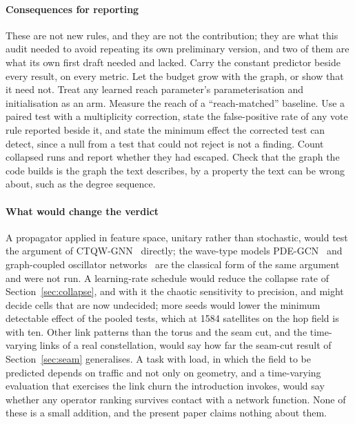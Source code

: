 \documentclass[preprint,11pt,3p]{elsarticle}
\begin{document}
\paragraph{Consequences for reporting}
These are not new rules, and they are not the contribution; they are what this audit needed to
avoid repeating its own preliminary version, and two of them are what its own first draft needed
and lacked. Carry the constant predictor beside every result, on every metric. Let the budget grow
with the graph, or show that it need not. Treat any learned reach parameter's parameterisation and
initialisation as an arm. Measure the reach of a ``reach-matched'' baseline. Use a paired test
with a multiplicity correction, state the false-positive rate of any vote rule reported beside
it, and state the minimum effect the corrected test can detect, since a null from a test that
could not reject is not a finding. Count collapsed runs and report whether they had escaped. Check
that the graph the code builds is the graph the text describes, by a property the text can be
wrong about, such as the degree sequence.

\paragraph{What would change the verdict}
A propagator applied in feature space, unitary rather than stochastic, would test the argument of
CTQW-GNN~\cite{ctqwgnn} directly; the wave-type models PDE-GCN~\cite{pdegcn} and graph-coupled
oscillator networks~\cite{graphcon} are the classical form of the same argument and were not run.
A learning-rate schedule would reduce the collapse rate of Section~\ref{sec:collapse}, and with
it the chaotic sensitivity to precision, and might decide cells that are now undecided; more
seeds would lower the minimum detectable effect of the pooled tests, which at 1584 satellites on
the hop field is \numPooledHopsShellOneMde{} with ten. Other link patterns than the torus and the
seam cut, and the time-varying links of a real constellation, would say how far the
seam-cut result of Section~\ref{sec:seam} generalises. A task with load, in which the field to be predicted depends
on traffic and not only on geometry, and a time-varying evaluation that exercises the link
churn the introduction invokes, would say whether any operator ranking survives contact with a
network function. None of these is a small addition, and the present paper claims nothing about
them.

\end{document}
